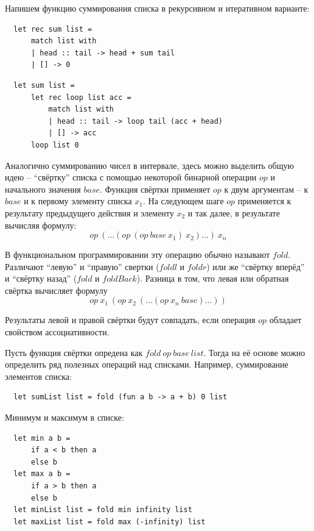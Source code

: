 \documentclass[a4paper,11pt]{article}
\begin{document}
Напишем функцию суммирования списка в рекурсивном и итеративном варианте:
\begin{lstlisting}
  let rec sum list =
      match list with
      | head :: tail -> head + sum tail
      | [] -> 0  
\end{lstlisting}

\begin{lstlisting}
  let sum list =
      let rec loop list acc =
          match list with
          | head :: tail -> loop tail (acc + head)
          | [] -> acc
      loop list 0
\end{lstlisting}

Аналогично суммированию чисел в интервале, здесь можно выделить общую идею -- 
``свёртку'' списка с помощью некоторой бинарной операции $op$ и начального 
значения $base$. Функция свёртки применяет $op$ к двум аргументам -- к $base$ и
к первому элементу списка $x_1$. На следующем шаге $op$ применяется к результату
предыдущего действия и элементу $x_2$ и так далее, в результате вычисляя формулу:
\begin{equation*}
  op~(\ldots (op~(op~base~x_1)~x_2) \ldots)~x_n
\end{equation*}

В функциональном программировании эту операцию обычно называют $fold$. Различают
``левую'' и ``правую'' свертки ($foldl$ и $foldr$) или же ``свёртку вперёд'' и
``свёртку назад'' ($fold$ и $foldBack$). Разница в том, что левая или обратная
свёртка вычисляет формулу
\begin{equation*}
  op~x_1~(op~x_2~(\ldots (op~x_n~base) \ldots))
\end{equation*}

Результаты левой и правой свёртки будут совпадать, если операция $op$ обладает
свойством ассоциативности.

Пусть функция свёртки опредена как $fold~op~base~list$. Тогда на её основе можно
определить ряд полезных операций над списками. Например, суммирование элементов
списка:
\begin{lstlisting}
  let sumList list = fold (fun a b -> a + b) 0 list
\end{lstlisting}

Минимум и максимум в списке:
\begin{lstlisting}
  let min a b = 
      if a < b then a
      else b
  let max a b = 
      if a > b then a
      else b
  let minList list = fold min infinity list
  let maxList list = fold max (-infinity) list
\end{lstlisting}
\end{document}
